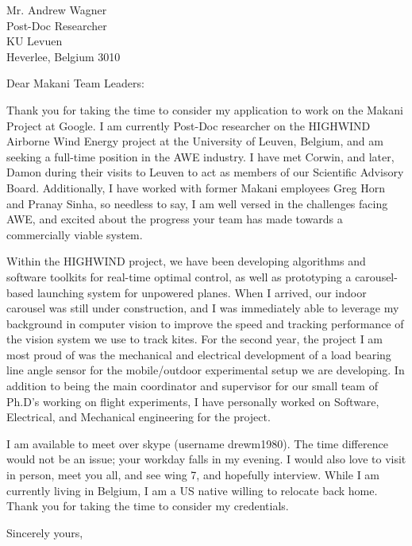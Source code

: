 \documentclass[11pt]{letter} %
\begin{document}
\signature{Andrew Wagner}                  %
\longindentation=0pt                       %
\let\raggedleft\raggedright                %
 
\begin{letter}{Mr. Andrew Wagner \\
Post-Doc Researcher \\
KU Levuen \\
Heverlee, Belgium 3010} 

\vfill %

\opening{Dear Makani Team Leaders:} 
 
\noindent Thank you for taking the time to consider my application to work on
the Makani Project at Google.  I am currently Post-Doc researcher on the
HIGHWIND Airborne Wind Energy project at the University of Leuven, Belgium, and
am seeking a full-time position in the AWE industry. I have met Corwin, and
later, Damon during their visits to Leuven to act as members of our Scientific
Advisory Board. Additionally, I have worked with former Makani employees Greg
Horn and Pranay Sinha, so needless to say, I am well versed in the challenges
facing AWE, and excited about the progress your team has made towards a
commercially viable system.  

\noindent Within the HIGHWIND project, we have been developing algorithms and
software toolkits for real-time optimal control, as well as prototyping a
carousel-based launching system for unpowered planes. When I arrived, our
indoor carousel was still under construction, and I was immediately able to
leverage my background in computer vision to improve the speed and tracking
performance of the vision system we use to track kites.  For the second year,
the project I am most proud of was the mechanical and electrical development of
a load bearing line angle sensor for the mobile/outdoor experimental setup we
are developing.  In addition to being the main coordinator and supervisor for
our small team of Ph.D's working on flight experiments, I have personally
worked on Software, Electrical, and Mechanical engineering for the project.  

\noindent I am available to meet over skype (username drewm1980).  The time
difference would not be an issue; your workday falls in my evening.  I would
also love to visit in person, meet you all, and see wing 7, and hopefully
interview.  While I am currently living in Belgium, I am a US native willing to
relocate back home.  Thank you for taking the time to consider my credentials.
 
\closing{Sincerely yours,}
 
\encl{}

\end{letter}
 
\end{document}
